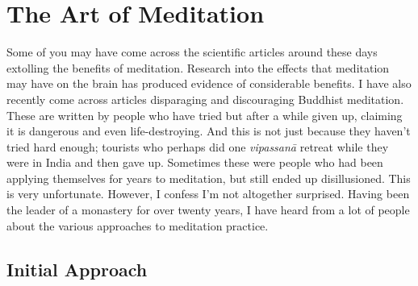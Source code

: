 
\chapter{The Art of Meditation}



Some of you may have come across the scientific articles around these
days extolling the benefits of meditation. Research into the effects
that meditation may have on the brain has produced evidence of
considerable benefits. I have also recently come across articles
disparaging and discouraging Buddhist meditation. These are written by
people who have tried but after a while given up, claiming it is
dangerous and even life-destroying. And this is not just because they
haven’t tried hard enough; tourists who perhaps did one \emph{vipassanā}
retreat while they were in India and then gave up. Sometimes these were
people who had been applying themselves for years to meditation, but
still ended up disillusioned. This is very unfortunate. However, I
confess I’m not altogether surprised. Having been the leader of a
monastery for over twenty years, I have heard from a lot of people about
the various approaches to meditation practice.

\section{Initial Approach}


